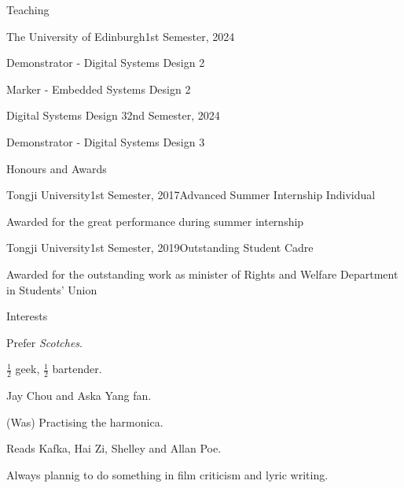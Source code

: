 \documentclass{resume} %
\begin{document}
\begin{rSection}{Teaching}
	
	\begin{rSubsection}{The University of Edinburgh}{1st Semester, 2024}{}{}
		\item Demonstrator - Digital Systems Design 2
		\item Marker - Embedded Systems Design 2
	\end{rSubsection}
	
	\begin{rSubsection}{Digital Systems Design 3}{2nd Semester, 2024}{}{}
		\item Demonstrator - Digital Systems Design 3
	\end{rSubsection}
	
\end{rSection}

\begin{rSection}{Honours and Awards}
	
	\begin{rSubsection}{Tongji University}{1st Semester, 2017}{Advanced Summer Internship Individual}{}
		\item Awarded for the great performance during summer internship
	\end{rSubsection}
		
	\begin{rSubsection}{Tongji University}{1st Semester, 2019}{Outstanding Student Cadre}{}
		\item Awarded for the outstanding work as minister of Rights and Welfare Department in Students' Union
	\end{rSubsection}

\end{rSection}

\begin{rSection}{Interests}
	\item Prefer \textit{Scotches}.
	\item $\frac{1}{2}$ geek, $\frac{1}{2}$ bartender.
	\item Jay Chou and Aska Yang fan. 
	\item (Was) Practising the harmonica.
	\item Reads Kafka, Hai Zi, Shelley and Allan Poe.
	\item Always plannig to do something in film criticism and lyric writing.
\end{rSection}
\end{document}
